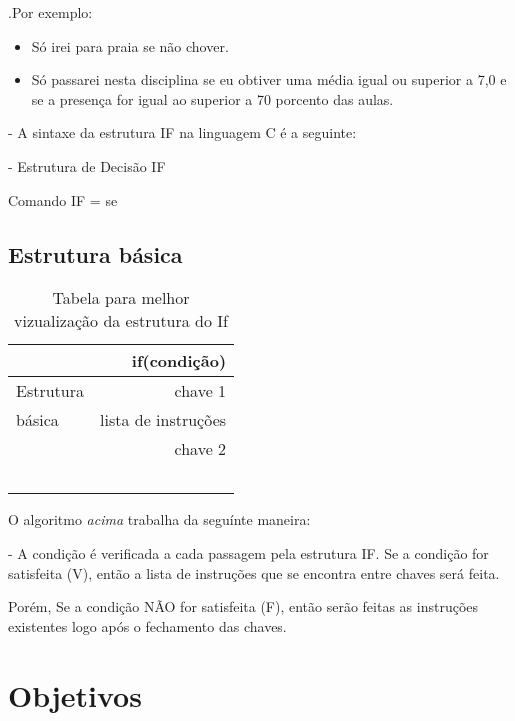 \documentclass[a4paper,10pt]{article}  %
\begin{document}
.Por exemplo:
\begin{itemize}
               
       \item  Só irei para praia se não chover. 
       \item  Só passarei nesta disciplina se eu obtiver uma média igual ou superior a 7,0 e se a presença for igual ao superior a 70 porcento das aulas.
             
\end{itemize}

  - A sintaxe da estrutura IF na linguagem C é a seguinte:
 
      - Estrutura de Decisão IF

Comando IF = se


\subsection{Estrutura básica}	       


\begin{table}
\begin{center}
 \caption{Tabela para melhor vizualização da estrutura do If}
\begin{tabular}{|l|r|}
  \hline \hline
  
  \           & if(condição) \\ \hline \hline
  Estrutura  &  chave 1  \\ \hline
   básica    &   lista de instruções  \\ \hline
  \           &  chave 2  \\ \hline
  \           & \\  \hline
\end{tabular}
\label{tab:resultados}
\end{center}
\end{table}

  O algoritmo \textit{acima} trabalha da seguínte maneira:
 
  - A condição é verificada a cada passagem pela estrutura IF. Se a condição for satisfeita (V), então a lista de instruções que se encontra entre chaves será feita. 

 Porém, Se a condição NÃO for satisfeita (F), então serão feitas as instruções existentes logo após o fechamento das chaves.


\section{Objetivos}
\end{document}
